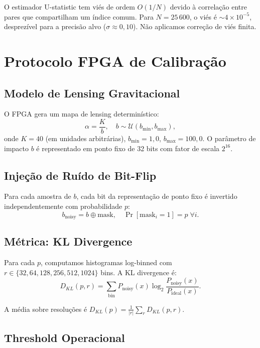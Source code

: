 \documentclass[12pt,a4paper,oneside]{book}
\theoremstyle{definition}
\theoremstyle{remark}
\begin{document}
O estimador U-statistic tem viés de ordem $O(1/N)$ devido à correlação entre pares que compartilham um índice comum. Para $N = 25\,600$, o viés é $\sim 4 \times 10^{-5}$, desprezível para a precisão alvo ($\sigma \approx 0{,}10$). Não aplicamos correção de viés finita.

\section{Protocolo FPGA de Calibração}

\subsection{Modelo de Lensing Gravitacional}

O FPGA gera um mapa de lensing determinístico:
\begin{equation}
    \alpha = \frac{K}{b}, \quad b \sim \mathcal{U}(b_{\min}, b_{\max}),
\end{equation}
onde $K = 40$ (em unidades arbitrárias), $b_{\min} = 1{,}0$, $b_{\max} = 100{,}0$. O parâmetro de impacto $b$ é representado em ponto fixo de 32 bits com fator de escala $2^{16}$.

\subsection{Injeção de Ruído de Bit-Flip}

Para cada amostra de $b$, cada bit da representação de ponto fixo é invertido independentemente com probabilidade $p$:
\begin{equation}
    b_{\text{noisy}} = b \oplus \text{mask}, \quad \Pr[\text{mask}_i = 1] = p \; \forall i.
\end{equation}

\subsection{Métrica: KL Divergence}

Para cada $p$, computamos histogramas log-binned com $r \in \{32, 64, 128, 256, 512, 1024\}$ bins. A KL divergence é:
\begin{equation}
    D_{KL}(p, r) = \sum_{\text{bin}} P_{\text{noisy}}(x) \log_2 \frac{P_{\text{noisy}}(x)}{P_{\text{ideal}}(x)}.
\end{equation}

A média sobre resoluções é $D_{KL}(p) = \frac{1}{|r|} \sum_r D_{KL}(p, r)$.

\subsection{Threshold Operacional}
\end{document}
